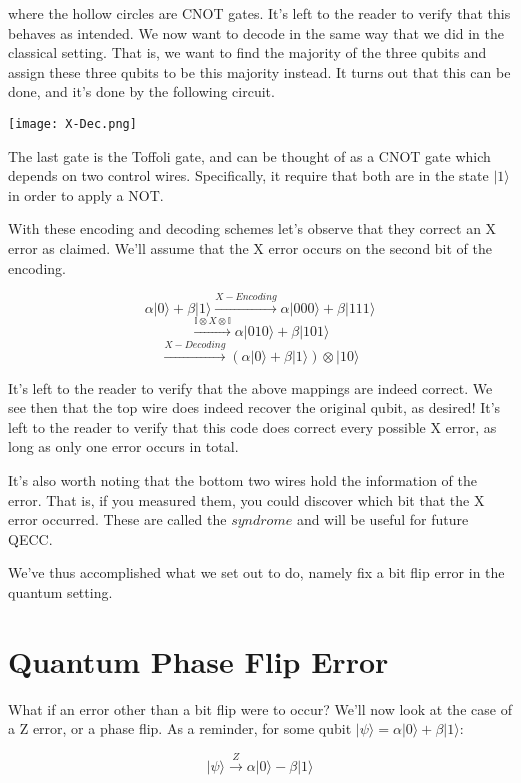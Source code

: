 \documentclass[11pt]{article}
\newcommand{\ket}[1]{\lvert #1 \rangle}
\begin{document}
where the hollow circles are CNOT gates. It's left to the reader to verify that this behaves as intended. We now want to decode in the same way that we did in the classical setting. That is, we want to find the majority of the three qubits and assign these three qubits to be this majority instead. It turns out that this can be done, and it's done by the following circuit.

{
\centering
\texttt{[image: X-Dec.png]}
\label{fig:Grammar}
\par 
}

The last gate is the Toffoli gate, and can be thought of as a CNOT gate which depends on two control wires. Specifically, it require that both are in the state $\ket1$ in order to apply a NOT. 

With these encoding and decoding schemes let's observe that they correct an X error as claimed. We'll assume that the X error occurs on the second bit of the encoding.

{
\[\alpha\ket{0} +  \beta\ket{1} \xrightarrow{X-Encoding} \alpha\ket{000} +  \beta\ket{111}\]
\[ \xrightarrow{\mathbb{I} \otimes X \otimes \mathbb{I} }\alpha\ket{010} +  \beta\ket{101}\]
\[\xrightarrow{X-Decoding} (\alpha\ket{0} +  \beta\ket{1}) \otimes \ket{10}\]
}

It's left to the reader to verify that the above mappings are indeed correct. We see then that the top wire does indeed recover the original qubit, as desired! It's left to the reader to verify that this code does correct every possible X error, as long as only one error occurs in total.

It's also worth noting that the bottom two wires hold the information of the error. That is, if you measured them, you could discover which bit that the X error occurred. These are called the $syndrome$ and will be useful for future QECC.

We've thus accomplished what we set out to do, namely fix a bit flip error in the quantum setting.

\section{Quantum Phase Flip Error}

What if an error other than a bit flip were to occur? We'll now look at the case of a Z error, or a phase flip. As a reminder, for some qubit $\ket{\psi} = \alpha\ket{0} +  \beta\ket{1}$:

{
\[\ket{\psi} \xrightarrow{Z} \alpha\ket{0} - \beta\ket{1}\]
} 
\end{document}
